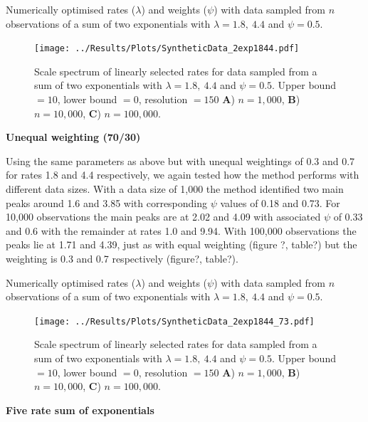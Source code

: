 \documentclass[11pt,usenames,dvipsnames]{article}
\begin{document}
\begin{table}[H]
	\centering
	\caption{Numerically optimised rates ($\lambda$) and weights ($\psi$) with data sampled from $n$ observations of a sum of two exponentials with $\lambda = 1.8,\ 4.4$ and $\psi = 0.5$.}
	
\end{table}


\begin{figure}[H]
	\centering
	\texttt{[image: ../Results/Plots/SyntheticData\_2exp1844.pdf]}
	\caption{Scale spectrum of linearly selected rates for data sampled from a sum of two exponentials with $\lambda = 1.8,\ 4.4$ and $\psi = 0.5$. Upper bound $= 10$, lower bound $= 0$, resolution $= 150$ \textbf{A}) $n = 1,000$, \textbf{B}) $n = 10,000$,  \textbf{C}) $n = 100,000$.}
\end{figure}

\noindent
\textbf{Unequal weighting (70/30)}

Using the same parameters as above but with unequal weightings of 0.3 and 0.7 for rates 1.8 and 4.4 respectively, we again tested how the method performs with different data sizes. With a data size of 1,000 the method identified two main peaks around 1.6 and 3.85 with corresponding $\psi$ values of 0.18 and 0.73. For 10,000 observations the main peaks are at 2.02 and 4.09 with associated $\psi$ of 0.33 and 0.6 with the remainder at rates 1.0 and 9.94. With 100,000 observations the peaks lie at 1.71 and 4.39, just as with equal weighting (figure ?, table?) but the weighting is 0.3 and 0.7 respectively (figure?, table?).

\begin{table}[H]
	\centering
	\caption{Numerically optimised rates ($\lambda$) and weights ($\psi$) with data sampled from $n$ observations of a sum of two exponentials with $\lambda = 1.8,\ 4.4$ and $\psi = 0.5$.}
	
\end{table}

\begin{figure}[H]
	\centering
	\texttt{[image: ../Results/Plots/SyntheticData\_2exp1844\_73.pdf]}
	\caption{Scale spectrum of linearly selected rates for data sampled from a sum of two exponentials with $\lambda = 1.8,\ 4.4$ and $\psi = 0.5$. Upper bound $= 10$, lower bound $= 0$, resolution $= 150$ \textbf{A}) $n = 1,000$, \textbf{B}) $n = 10,000$,  \textbf{C}) $n = 100,000$.}
\end{figure}

\noindent
\textbf{Five rate sum of exponentials}
\end{document}
